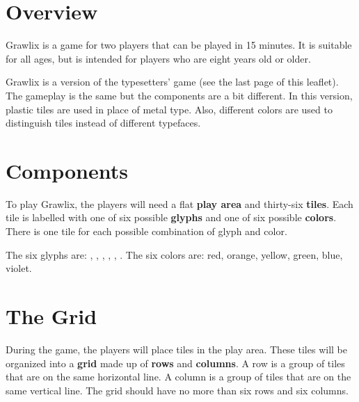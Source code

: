 \documentclass[a4paper, 10pt, notumble]{leaflet}
\begin{document}
\section{Overview}
Grawlix is a game for two players that can be played in 15  minutes. It is suitable for all ages, but is intended for players who are eight years old or older.

Grawlix is a version of the typesetters' game (see the last page of this leaflet). The gameplay is the same but the components are a bit different. In this version, plastic tiles are used in place of metal type. Also, different colors are used to distinguish tiles instead of different typefaces.

\section{Components}
To play Grawlix, the players will need a flat \textbf{play area} and thirty-six \textbf{tiles}. Each tile is labelled with one of six possible \textbf{glyphs} and one of six possible \textbf{colors}.  There is one tile for each possible combination of glyph and color.

The six glyphs are: \smallat, \smallpound, \smalldollar, \smallpercent, \smallampersand, \smallasterisk. The six colors are: red, orange, yellow, green, blue, violet.

\begin{figure}[h]
\centering
{}

\end{figure}

\newpage

\section{The Grid}
During the game, the players will place tiles in the play area. These tiles will be organized into a \textbf{grid} made up of \textbf{rows} and \textbf{columns}. A row is a group of tiles that are on the same horizontal line.  A column is a group of tiles that are on the same vertical line. The grid should have no more than six rows and six columns.
\end{document}
